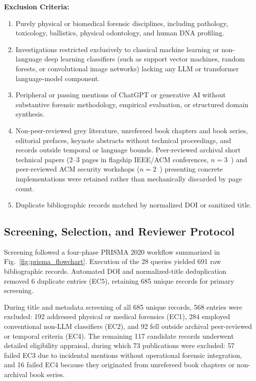 \textbf{Exclusion Criteria:}
\begin{enumerate}
    \item[\textbf{EC1:}] Purely physical or biomedical forensic disciplines, including pathology, toxicology, ballistics, physical odontology, and human DNA profiling.
    \item[\textbf{EC2:}] Investigations restricted exclusively to classical machine learning or non-language deep learning classifiers (such as support vector machines, random forests, or convolutional image networks) lacking any LLM or transformer language-model component.
    \item[\textbf{EC3:}] Peripheral or passing mentions of ChatGPT or generative AI without substantive forensic methodology, empirical evaluation, or structured domain synthesis.
    \item[\textbf{EC4:}] Non-peer-reviewed grey literature, unrefereed book chapters and book series, editorial prefaces, keynote abstracts without technical proceedings, and records outside temporal or language bounds. Peer-reviewed archival short technical papers (2--3 pages in flagship IEEE/ACM conferences, $n=3$~\cite{xu2025_enhancing, sudheer2026_least, hammar2026_a}) and peer-reviewed ACM security workshops ($n=2$~\cite{chernyshev2023_towards, sava2026_triagecpg}) presenting concrete implementations were retained rather than mechanically discarded by page count.
    \item[\textbf{EC5:}] Duplicate bibliographic records matched by normalized DOI or sanitized title.
\end{enumerate}

\subsection{Screening, Selection, and Reviewer Protocol}
Screening followed a four-phase PRISMA 2020 workflow summarized in Fig.~\ref{fig:prisma_flowchart}. Execution of the 28 queries yielded 691 raw bibliographic records. Automated DOI and normalized-title deduplication removed 6 duplicate entries (EC5), retaining 685 unique records for primary screening.



During title and metadata screening of all 685 unique records, 568 entries were excluded: 192 addressed physical or medical forensics (EC1), 284 employed conventional non-LLM classifiers (EC2), and 92 fell outside archival peer-reviewed or temporal criteria (EC4). The remaining 117 candidate records underwent detailed eligibility appraisal, during which 73 publications were excluded: 57 failed EC3 due to incidental mentions without operational forensic integration, and 16 failed EC4 because they originated from unrefereed book chapters or non-archival book series.

